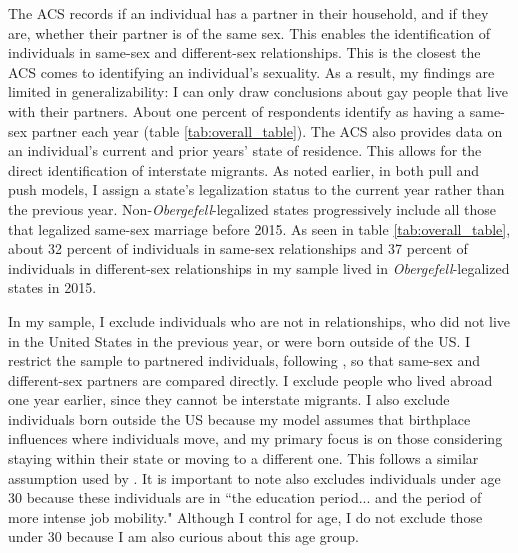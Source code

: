 \documentclass[12pt,letterpaper]{article}
\begin{document}
The ACS records if an individual has a partner in their household, and if they are, whether their partner is of the same sex. This enables the identification of individuals in same-sex and different-sex relationships. This is the closest the ACS comes to identifying an individual's sexuality. As a result, my findings are limited in generalizability: I can only draw conclusions about gay people that live with their partners. About one percent of respondents identify as having a same-sex partner each year (table \ref{tab:overall_table}). The ACS also provides data on an individual's current and prior years' state of residence. This allows for the direct identification of interstate migrants. As noted earlier, in both pull and push models, I assign a state's legalization status to the current year rather than the previous year. Non-\textit{Obergefell}-legalized states progressively include all those that legalized same-sex marriage before 2015. As seen in table \ref{tab:overall_table}, about 32 percent of individuals in same-sex relationships and 37 percent of individuals in different-sex relationships in my sample lived in \textit{Obergefell}-legalized states in 2015.
\FloatBarrier


In my sample, I exclude individuals who are not in relationships, who did not live in the United States in the previous year, or were born outside of the US. I restrict the sample to partnered individuals, following \citet{1}, so that same-sex and different-sex partners are compared directly. I exclude people who lived abroad one year earlier, since they cannot be interstate migrants. I also exclude individuals born outside the US because my model assumes that birthplace influences where individuals move, and my primary focus is on those considering staying within their state or moving to a different one. This follows a similar assumption used by \citet{12}. It is important to note \citet[446]{1} also excludes individuals under age 30 because these individuals are in ``the education period... and the period of more intense job mobility." Although I control for age, I do not exclude those under 30 because I am also curious about this age group.
\end{document}

